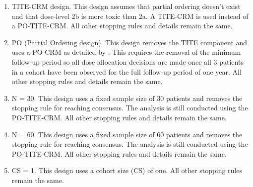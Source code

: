 \begin{enumerate}
	\item TITE-CRM design. This design assumes that partial ordering doesn't exist and that dose-level 2b is more toxic than 2a. A TITE-CRM is used instead of a PO-TITE-CRM. All other stopping rules and details remain the same. 
	\item PO (Partial Ordering design). This design removes the TITE component and uses a PO-CRM as detailed by \cite{wagesContinualReassessmentMethod2011}. This requires the removal of the minimum follow-up period so all dose allocation decisions are made once all 3 patients in a cohort have been observed for the full follow-up period of one year. All other stopping rules and details remain the same. 
	\item N = 30. This design uses a fixed sample size of 30 patients and removes the stopping rule for reaching consensus. The analysis is still conducted using the PO-TITE-CRM. All other stopping rules and details remain the same. 
	\item N = 60. This design uses a fixed sample size of 60 patients and removes the stopping rule for reaching consensus. The analysis is still conducted using the PO-TITE-CRM. All other stopping rules and details remain the same. 
	\item CS = 1. This design uses a cohort size (CS) of one. All other stopping rules remain the same.  
\end{enumerate} 

